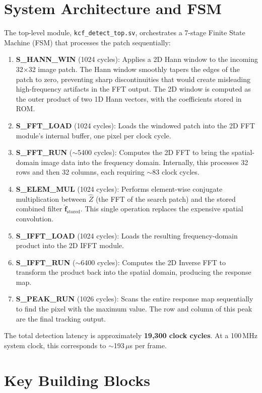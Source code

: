 \documentclass[a4paper,12pt]{report}
\begin{document}
\section{System Architecture and FSM}
The top-level module, \texttt{kcf\_detect\_top.sv}, orchestrates a 7-stage Finite State Machine (FSM) that processes the patch sequentially:
\begin{enumerate}
    \item \textbf{S\_HANN\_WIN} (1024 cycles): Applies a 2D Hann window to the incoming 32$\times$32 image patch. The Hann window smoothly tapers the edges of the patch to zero, preventing sharp discontinuities that would create misleading high-frequency artifacts in the FFT output. The 2D window is computed as the outer product of two 1D Hann vectors, with the coefficients stored in ROM.
    \item \textbf{S\_FFT\_LOAD} (1024 cycles): Loads the windowed patch into the 2D FFT module's internal buffer, one pixel per clock cycle.
    \item \textbf{S\_FFT\_RUN} ($\sim$5400 cycles): Computes the 2D FFT to bring the spatial-domain image data into the frequency domain. Internally, this processes 32 rows and then 32 columns, each requiring $\sim$83 clock cycles.
    \item \textbf{S\_ELEM\_MUL} (1024 cycles): Performs element-wise conjugate multiplication between $\hat{Z}$ (the FFT of the search patch) and the stored combined filter $\hat{\mathbf{f}}_{\text{stored}}$. This single operation replaces the expensive spatial convolution.
    \item \textbf{S\_IFFT\_LOAD} (1024 cycles): Loads the resulting frequency-domain product into the 2D IFFT module.
    \item \textbf{S\_IFFT\_RUN} ($\sim$6400 cycles): Computes the 2D Inverse FFT to transform the product back into the spatial domain, producing the response map.
    \item \textbf{S\_PEAK\_RUN} (1026 cycles): Scans the entire response map sequentially to find the pixel with the maximum value. The row and column of this peak are the final tracking output.
\end{enumerate}
The total detection latency is approximately \textbf{19,300 clock cycles}. At a 100\,MHz system clock, this corresponds to $\sim$193\,$\mu$s per frame.

\section{Key Building Blocks}
\end{document}
